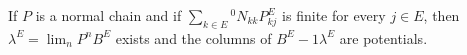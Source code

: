 If $P$ is a normal chain and if $\sum_{k \in E} {}^0N_{kk} P^E_{kj}$ is finite for every $j \in E$, then $\lambda^E = \lim_n P^n B^E$ exists and the columns of $B^E - 1 \lambda^E$ are potentials.
